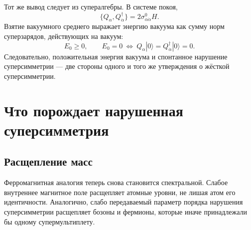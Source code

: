 Тот же вывод следует из супералгебры. В системе покоя,
\begin{equation}
\{Q_\alpha,Q_{\dot\alpha}^\dagger\}
=2\sigma^0_{\alpha\dot\alpha}H.
\end{equation}
Взятие вакуумного среднего выражает энергию вакуума как сумму норм суперзарядов, действующих на вакуум:
\begin{equation}
E_0\ge0,
\qquad
E_0=0
\ \Longleftrightarrow\
Q_\alpha|0\rangle
=Q_{\dot\alpha}^\dagger|0\rangle=0.
\label{eq:l9-algebra-vacuum-energy}
\end{equation}
Следовательно, положительная энергия вакуума и спонтанное нарушение суперсимметрии — две стороны одного и того же утверждения о жёсткой суперсимметрии.

\begin{center}
\end{center}


\section{Что порождает нарушенная суперсимметрия}

\subsection{Расщепление масс}

Ферромагнитная аналогия теперь снова становится спектральной. Слабое внутреннее магнитное поле расщепляет атомные уровни, не лишая атом его идентичности. Аналогично, слабо передаваемый параметр порядка нарушения суперсимметрии расщепляет бозоны и фермионы, которые иначе принадлежали бы одному супермультиплету.

